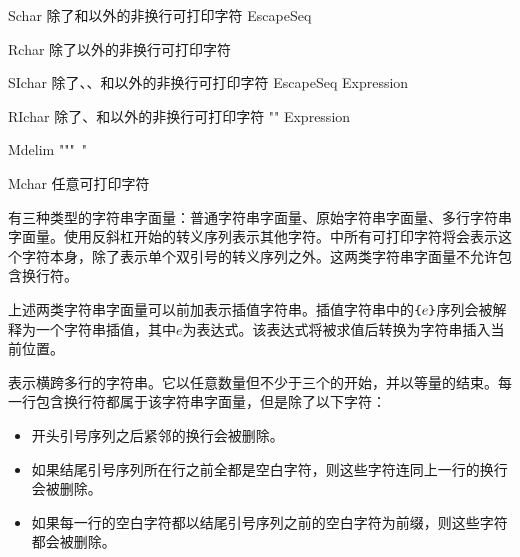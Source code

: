 \begin{bnf}{Schar}
    \textnormal{除了\terminal{\textbackslash}和以外的非换行可打印字符} \br
    EscapeSeq
\end{bnf}

\begin{bnf}{Rchar}
    \textnormal{除了以外的非换行可打印字符} \br
\end{bnf}

\begin{bnf}{SIchar}
    \textnormal{除了\terminal{\textbackslash}、、\terminal{\{}和\terminal{\}}以外的非换行可打印字符} \br
    EscapeSeq \br
    \terminal{\{} Expression \terminal{\}} \br
    \terminal{\{\{} \br
    \terminal{\}\}}
\end{bnf}

\begin{bnf}{RIchar}
    \textnormal{除了、\terminal{\{}和\terminal{\}}以外的非换行可打印字符} \br
    "" \br
    \terminal{\{} Expression \terminal{\}} \br
    \terminal{\{\{} \br
    \terminal{\}\}}
\end{bnf}

\begin{bnf}{Mdelim}
    """\ "\bnfs
\end{bnf}

\begin{bnf}{Mchar}
    \textnormal{任意可打印字符}
\end{bnf}

\pnum
有三种类型的字符串字面量：普通字符串字面量、原始字符串字面量、多行字符串字面量。使用反斜杠开始的转义序列表示其他字符。中所有可打印字符将会表示这个字符本身，除了表示单个双引号的转义序列之外。这两类字符串字面量不允许包含换行符。

\pnum
上述两类字符串字面量可以前加\tcode{\$}表示插值字符串。插值字符串中的$\texttt{\{}e\texttt{\}}$序列会被解释为一个字符串插值，其中$e$为表达式。该表达式将被求值后转换为字符串插入当前位置。

\pnum
{}表示横跨多行的字符串。它以任意数量但不少于三个的开始，并以等量的结束。每一行包含换行符都属于该字符串字面量，但是除了以下字符：

\begin{itemize}
    \item 开头引号序列之后紧邻的换行会被删除。
    \item 如果结尾引号序列所在行之前全都是空白字符，则这些字符连同上一行的换行会被删除。
    \item 如果每一行的空白字符都以结尾引号序列之前的空白字符为前缀，则这些字符都会被删除。
\end{itemize}


